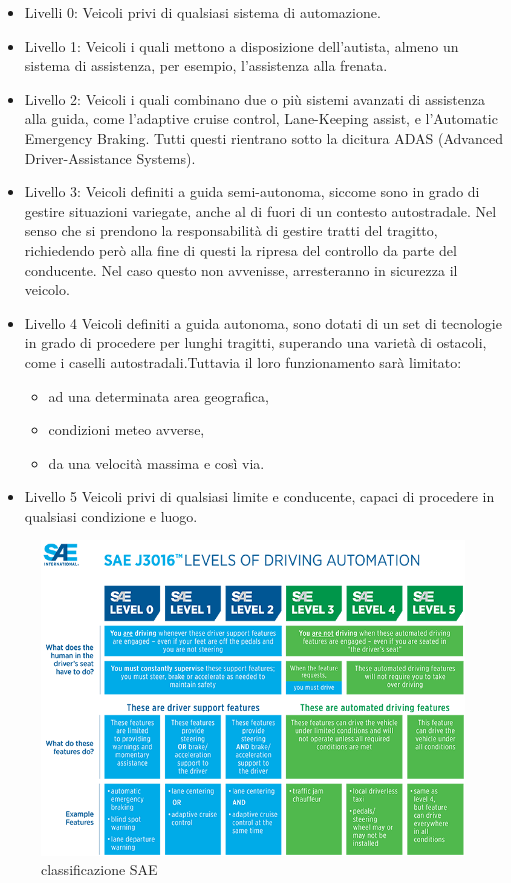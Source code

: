 \documentclass[14pt]{extarticle}
\begin{document}
\begin{itemize}
\item Livelli 0:
Veicoli privi di qualsiasi sistema di automazione.
\item Livello 1: 
Veicoli  i quali mettono a disposizione dell'autista, almeno un sistema di assistenza, per esempio, l'assistenza alla frenata.
\item Livello 2:
Veicoli i quali combinano due o più sistemi avanzati di assistenza alla guida, come l'adaptive cruise control, Lane-Keeping assist, e l'Automatic Emergency Braking. Tutti questi rientrano sotto la dicitura ADAS (Advanced Driver-Assistance Systems). 
\item Livello 3:
Veicoli definiti a guida semi-autonoma, siccome sono in grado di  gestire situazioni variegate, anche al di fuori di un contesto autostradale. Nel senso che si prendono la responsabilità di gestire tratti del tragitto, richiedendo però alla fine di questi la ripresa del controllo da parte del conducente. Nel caso questo non avvenisse, arresteranno in sicurezza il  veicolo.
\item Livello 4
Veicoli definiti a guida autonoma, sono dotati di un set di tecnologie in grado di procedere per lunghi tragitti, superando una varietà di ostacoli, come i caselli autostradali.Tuttavia il loro funzionamento sarà limitato:
\begin{itemize}
\item ad una determinata area geografica,
\item condizioni meteo avverse,
\item da una velocità massima e così via.
\end{itemize}
\item Livello 5
Veicoli privi di qualsiasi limite e conducente, capaci di procedere in qualsiasi condizione e luogo.
\end{itemize}
\begin{figure}
\centering
\includegraphics[scale=0.65]{SAE_level_automation.png}
\caption{classificazione SAE}
\label{fig:classificazioneSAE}
\end{figure}
\end{document}
